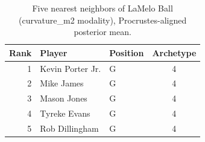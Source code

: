 \begin{table}[htbp]
  \centering\small
  \begin{tabular}{rllc}
    \toprule
    Rank & Player & Position & Archetype \\
    \midrule
    1 & Kevin Porter Jr. & G & 4 \\
    2 & Mike James & G & 4 \\
    3 & Mason Jones & G & 4 \\
    4 & Tyreke Evans & G & 4 \\
    5 & Rob Dillingham & G & 4 \\
    \bottomrule
  \end{tabular}
  \caption{Five nearest neighbors of LaMelo Ball (curvature_m2 modality), Procrustes-aligned posterior mean.}
  \label{tab:LaMelo_Ball_neighbors_curvature_m2}
\end{table}

